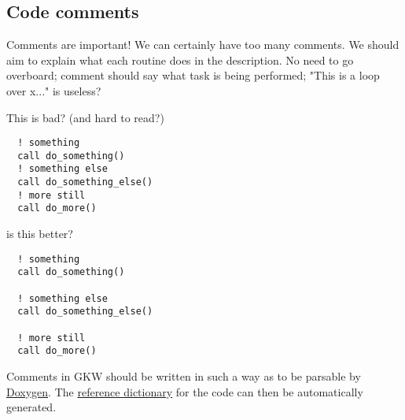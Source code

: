 \documentclass[12pt,twoside,notitlepage,a4paper]{article}
\begin{document}
\subsection{Code comments} 

Comments are important! We can certainly have too many comments. We should aim
to explain what each routine does in the description. No need to go overboard;
comment should say what task is being performed; "This is a loop over x..."
is useless?

This is bad? (and hard to read?)
\begin{verbatim}
  ! something
  call do_something()
  ! something else
  call do_something_else()
  ! more still
  call do_more()
\end{verbatim}
is this better?
\begin{verbatim}
  ! something
  call do_something()

  ! something else
  call do_something_else()
  
  ! more still
  call do_more()
\end{verbatim}


Comments in GKW should be written in such a way as to be parsable by \href{http://www.doxygen.org}{Doxygen}.
The \href{http://www.gkw.org.uk/doxygen}{reference dictionary} for the code can then be automatically generated.
\end{document}

